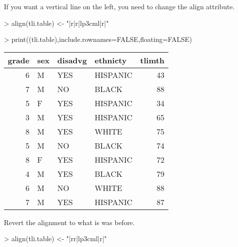 \documentclass[letterpaper]{article}
\begin{document}
If you want a vertical line on the left, you need to change the align attribute.
\begin{Schunk}
\begin{Sinput}
> align(tli.table) <- "|r|r|lp{3cm}l|r|"
\end{Sinput}
\end{Schunk}
\begin{Schunk}
\begin{Sinput}
> print((tli.table),include.rownames=FALSE,floating=FALSE)
\end{Sinput}
% latex table generated in R 3.1.1 by xtable 1.7-3 package
% 
\begin{tabular}{|r|lp{3cm}l|r|}
  \hline
grade & sex & disadvg & ethnicty & tlimth \\ 
  \hline
6 & M & YES & HISPANIC & 43 \\ 
   7 & M & NO & BLACK & 88 \\ 
    5 & F & YES & HISPANIC &  34 \\ 
     3 & M & YES & HISPANIC &   65 \\ 
      8 & M & YES & WHITE &    75 \\ 
  5 & M & NO & BLACK & 74 \\ 
   8 & F & YES & HISPANIC & 72 \\ 
    4 & M & YES & BLACK &  79 \\ 
     6 & M & NO & WHITE &   88 \\ 
      7 & M & YES & HISPANIC &    87 \\ 
   \hline
\end{tabular}\end{Schunk}

Revert the alignment to what is was before.
\begin{Schunk}
\begin{Sinput}
> align(tli.table) <- "|rr|lp{3cm}l|r|"
\end{Sinput}
\end{Schunk}
\end{document}
